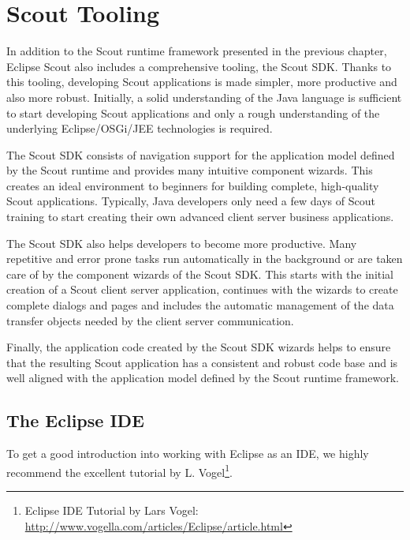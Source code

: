 \documentclass[a4paper,10pt,twoside]{book}
\begin{document}
  \sloppy
\fi

\chapter{Scout Tooling}

In addition to the Scout runtime framework presented in the previous chapter, Eclipse Scout also includes a comprehensive tooling, the Scout SDK. 
Thanks to this tooling, developing Scout applications is made simpler, more productive and also more robust. 
Initially, a solid understanding of the Java language is sufficient to start developing Scout applications and only a rough understanding of the underlying Eclipse/OSGi/JEE technologies is required. 

The Scout SDK consists of navigation support for the application model defined by the Scout runtime and provides many intuitive component wizards. 
This creates an ideal environment to beginners for building complete, high-quality Scout applications. 
Typically, Java developers only need a few days of Scout training to start creating their own advanced client server business applications. 

The Scout SDK also helps developers to become more productive.
Many repetitive and error prone tasks run automatically in the background or are taken care of by the component wizards of the Scout SDK. 
This starts with the initial creation of a Scout client server application, continues with the wizards to create complete dialogs and pages and includes the automatic management of the data transfer objects needed by the client server communication.

Finally, the application code created by the Scout SDK wizards helps to ensure that the resulting Scout application has a consistent and robust code base and is well aligned with the application model defined by the Scout runtime framework.

\section{The Eclipse IDE}

To get a good introduction into working with Eclipse as an IDE, we highly recommend the excellent tutorial by L. Vogel\footnote{
Eclipse IDE Tutorial by Lars Vogel: \url{http://www.vogella.com/articles/Eclipse/article.html}
}.
\end{document}
